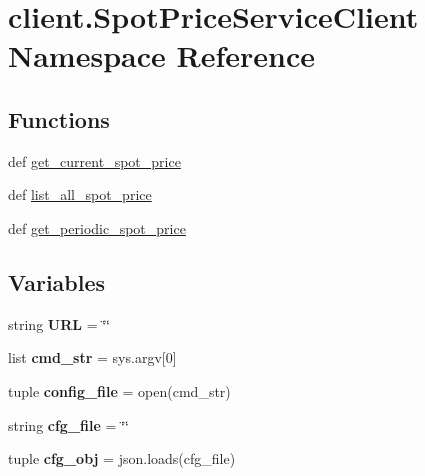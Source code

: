 \hypertarget{namespaceclient_1_1SpotPriceServiceClient}{\section{client.\-Spot\-Price\-Service\-Client Namespace Reference}
\label{namespaceclient_1_1SpotPriceServiceClient}
}
\subsection*{Functions}
\begin{DoxyCompactItemize}
\item 
def \hyperlink{namespaceclient_1_1SpotPriceServiceClient_a18943f91ffee035c1c9389121e6826e3}{get\-\_\-current\-\_\-spot\-\_\-price}
\item 
def \hyperlink{namespaceclient_1_1SpotPriceServiceClient_ab557fd36cac03948b987f356e6f9f138}{list\-\_\-all\-\_\-spot\-\_\-price}
\item 
def \hyperlink{namespaceclient_1_1SpotPriceServiceClient_a8a726458a637536e068ffd04d0c5f8a6}{get\-\_\-periodic\-\_\-spot\-\_\-price}
\end{DoxyCompactItemize}
\subsection*{Variables}
\begin{DoxyCompactItemize}
\item 
\hypertarget{namespaceclient_1_1SpotPriceServiceClient_a16ba7b1dd49702d3d43bbf98683bb3c0}{string {\bfseries U\-R\-L} = \char`\"{}\char`\"{}}\label{namespaceclient_1_1SpotPriceServiceClient_a16ba7b1dd49702d3d43bbf98683bb3c0}

\item 
\hypertarget{namespaceclient_1_1SpotPriceServiceClient_a9e31390bc67d0a3884ffac121a131662}{list {\bfseries cmd\-\_\-str} = sys.\-argv\mbox{[}0\mbox{]}}\label{namespaceclient_1_1SpotPriceServiceClient_a9e31390bc67d0a3884ffac121a131662}

\item 
\hypertarget{namespaceclient_1_1SpotPriceServiceClient_ac9452df76d6c593905b805e888f4b4a2}{tuple {\bfseries config\-\_\-file} = open(cmd\-\_\-str)}\label{namespaceclient_1_1SpotPriceServiceClient_ac9452df76d6c593905b805e888f4b4a2}

\item 
\hypertarget{namespaceclient_1_1SpotPriceServiceClient_a506318a9f36a26d0e60c8f81a488acf4}{string {\bfseries cfg\-\_\-file} = \char`\"{}\char`\"{}}\label{namespaceclient_1_1SpotPriceServiceClient_a506318a9f36a26d0e60c8f81a488acf4}

\item 
\hypertarget{namespaceclient_1_1SpotPriceServiceClient_a1e08620c9865d4ebaa4f657c8bf32372}{tuple {\bfseries cfg\-\_\-obj} = json.\-loads(cfg\-\_\-file)}\label{namespaceclient_1_1SpotPriceServiceClient_a1e08620c9865d4ebaa4f657c8bf32372}

\end{DoxyCompactItemize}


